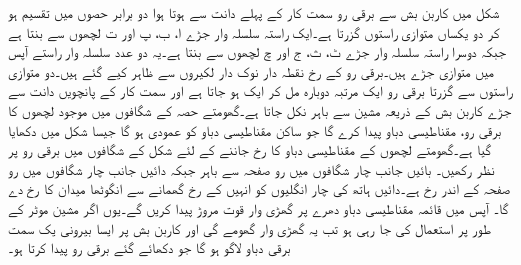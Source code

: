 شکل   میں کاربن بش سے برقی رو سمت کار کے پہلے دانت سے ہوتا ہوا دو برابر حصوں  میں تقسیم ہو کر دو یکساں متوازی راستوں گزرتا ہے۔ایک راستہ سلسلہ وار جڑے ا، ب، پ اور ت لچھوں سے بنتا ہے جبکہ دوسرا راستہ سلسلہ وار جڑے ٹ، ث، ج اور چ لچھوں سے بنتا ہے۔یہ دو عدد سلسلہ وار راستے آپس میں متوازی جڑے ہیں۔برقی رو کے رخ نقطہ دار نوک دار لکیروں سے ظاہر کیے گئے ہیں۔دو متوازی راستوں سے گزرتا برقی رو ایک مرتبہ دوبارہ مل کر ایک ہو جاتا ہے اور سمت کار کے پانچویں دانت سے جڑے کاربن بش کے ذریعہ مشین سے باہر نکل جاتا ہے۔گھومتے حصہ کے شگافوں میں موجود لچھوں کا برقی رو،  مقناطیسی دباو پیدا کرے گا جو ساکن مقناطیسی دباو کو عمودی ہو گا جیسا شکل   میں دکھایا گیا ہے۔گھومتے لچھوں کے مقناطیسی دباو کا  رخ جاننے  کے لئے
 شکل  کے  شگافوں  میں برقی رو پر نظر رکھیں۔ بائیں جانب چار شگافوں میں رو صفحہ سے باہر جبکہ دائیں جانب چار شگافوں میں رو صفحہ کے اندر رخ ہے۔دائیں ہاتھ کی چار انگلیوں کو انہیں کے رخ گھمانے سے انگوٹھا میدان کا رخ دے گا۔ آپس میں قائمہ مقناطیسی دباو دھرے پر گھڑی وار قوت مروڑ پیدا کریں گے۔یوں اگر مشین موٹر کے طور پر استعمال کی جا رہی ہو تب یہ گھڑی وار گھومے گی اور کاربن بش پر ایسا بیرونی یک سمت  برقی دباو لاگو ہو گا جو دکھائے گئے برقی رو پیدا کرتا ہو۔
